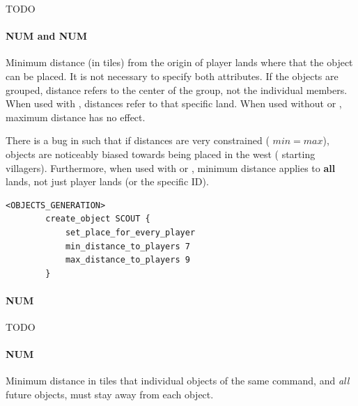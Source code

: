    TODO

    \paragraph{ NUM and  NUM}

    Minimum distance (in tiles) from the origin of player lands where that the object can be placed. It is not necessary to specify both attributes. If the objects are grouped, distance refers to the center of the group, not the individual members. When used with , distances refer to that specific land. When used without  or , maximum distance has no effect.
    
    \begin{attention}
        There is a bug in \aoe{} such that if distances are very constrained (\ie{} $min=max$), objects are noticeably biased towards being placed in the west (\ie{} starting villagers). Furthermore, when used with  or , minimum distance applies to \textbf{all} lands, not just player lands (or the specific ID).
    \end{attention}

    \begin{lstlisting}[language={rms}, caption={Place the starting scout at a distance of 7-9 tiles}]
        <OBJECTS_GENERATION>
        create_object SCOUT {
            set_place_for_every_player
            min_distance_to_players 7
            max_distance_to_players 9
        }
    \end{lstlisting}


    \paragraph{ NUM}

    TODO

    \paragraph{ NUM}

    Minimum distance in tiles that individual objects of the same  command, and \textit{all} future objects, must stay away from each object.

